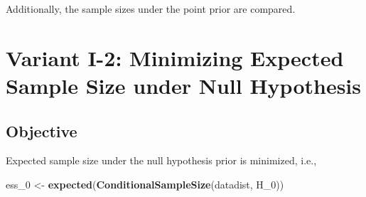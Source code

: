 \documentclass[]{book}
\newenvironment{Shaded}{\begin{snugshade}}{\end{snugshade}}
\newcommand{\DataTypeTok}[1]{\textcolor[rgb]{0.13,0.29,0.53}{#1}}
\newcommand{\DecValTok}[1]{\textcolor[rgb]{0.00,0.00,0.81}{#1}}
\newcommand{\FloatTok}[1]{\textcolor[rgb]{0.00,0.00,0.81}{#1}}
\newcommand{\KeywordTok}[1]{\textcolor[rgb]{0.13,0.29,0.53}{\textbf{#1}}}
\newcommand{\NormalTok}[1]{#1}
\newcommand{\OperatorTok}[1]{\textcolor[rgb]{0.81,0.36,0.00}{\textbf{#1}}}
\newcommand{\StringTok}[1]{\textcolor[rgb]{0.31,0.60,0.02}{#1}}
\begin{document}
Additionally, the sample sizes under the point prior are compared.

\begin{Shaded}
\end{Shaded}

\hypertarget{variantI_2}{%
\section{Variant I-2: Minimizing Expected Sample Size under Null Hypothesis}\label{variantI_2}}

\hypertarget{objective-1}{%
\subsection{Objective}\label{objective-1}}

Expected sample size under the null hypothesis prior is minimized, i.e.,

\begin{Shaded}
\begin{Highlighting}[]
\NormalTok{ess_}\DecValTok{0}\NormalTok{ <-}\StringTok{ }\KeywordTok{expected}\NormalTok{(}\KeywordTok{ConditionalSampleSize}\NormalTok{(datadist, H_}\DecValTok{0}\NormalTok{))}
\end{Highlighting}
\end{Shaded}
\end{document}
